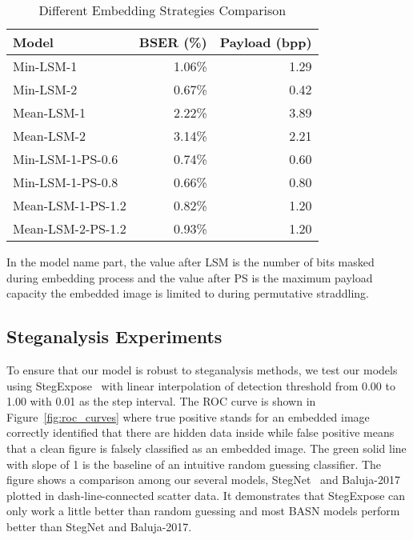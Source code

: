 \begin{table}
  \centering
  \begin{tabular}{lrr}
    \toprule
    Model             & BSER (\%) & Payload (bpp) \\
    \midrule
    Min-LSM-1         & 1.06\%    & 1.29          \\
    Min-LSM-2         & 0.67\%    & 0.42          \\
    Mean-LSM-1        & 2.22\%    & 3.89          \\
    Mean-LSM-2        & 3.14\%    & 2.21          \\
    Min-LSM-1-PS-0.6  & 0.74\%    & 0.60          \\
    Min-LSM-1-PS-0.8  & 0.66\%    & 0.80          \\
    Mean-LSM-1-PS-1.2 & 0.82\%    & 1.20          \\
    Mean-LSM-2-PS-1.2 & 0.93\%    & 1.20          \\
    \bottomrule
  \end{tabular}
  \caption{Different Embedding Strategies Comparison}%
  \label{tab:diff_strategies_comparison}
  \vspace{\baselineskip}
  In the model name part, the value after LSM is the number of bits masked during embedding process and the value after PS is the maximum payload capacity the embedded image is limited to during permutative straddling.
\end{table}

\figureSteganographyResultMeanLSMOne%

\subsection{Steganalysis Experiments}

To ensure that our model is robust to steganalysis methods, we test our models using StegExpose~\cite{StegExpose} with linear interpolation of detection threshold from 0.00 to 1.00 with 0.01 as the step interval. The ROC curve is shown in Figure~\ref{fig:roc_curves} where true positive stands for an embedded image correctly identified that there are hidden data inside while false positive means that a clean figure is falsely classified as an embedded image. The green solid line with slope of 1 is the baseline of an intuitive random guessing classifier. The figure shows a comparison among our several models, StegNet~\cite{StegNet} and Baluja-2017~\cite{HIPS} plotted in dash-line-connected scatter data. It demonstrates that StegExpose can only work a little better than random guessing and most BASN models perform better than StegNet and Baluja-2017.

